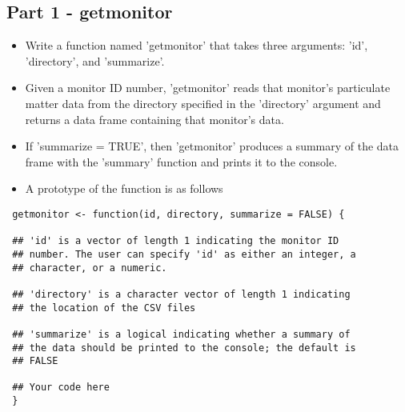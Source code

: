 \documentclass[12pt]{article}
\begin{document}
\subsection{Part 1 - getmonitor}
 \begin{itemize}
\item Write a function named 'getmonitor' that takes three arguments: 'id', 'directory', and 'summarize'. \item Given a monitor ID number, 'getmonitor' reads that monitor's particulate matter data from the directory specified in the 'directory' argument and returns a data frame containing that monitor's data. 
 \item If 'summarize = TRUE', then 'getmonitor' produces a summary of the data frame with the 'summary' function and prints it to the console. \item A prototype of the function is as follows
 \end{itemize}
 \begin{framed}
 \begin{verbatim}
 getmonitor <- function(id, directory, summarize = FALSE) {
 
 ## 'id' is a vector of length 1 indicating the monitor ID
 ## number. The user can specify 'id' as either an integer, a
 ## character, or a numeric.
         
 ## 'directory' is a character vector of length 1 indicating
 ## the location of the CSV files
 
 ## 'summarize' is a logical indicating whether a summary of
 ## the data should be printed to the console; the default is
 ## FALSE
      
 ## Your code here
 }
 \end{verbatim}
 \end{framed}
 \newpage
\end{document}
